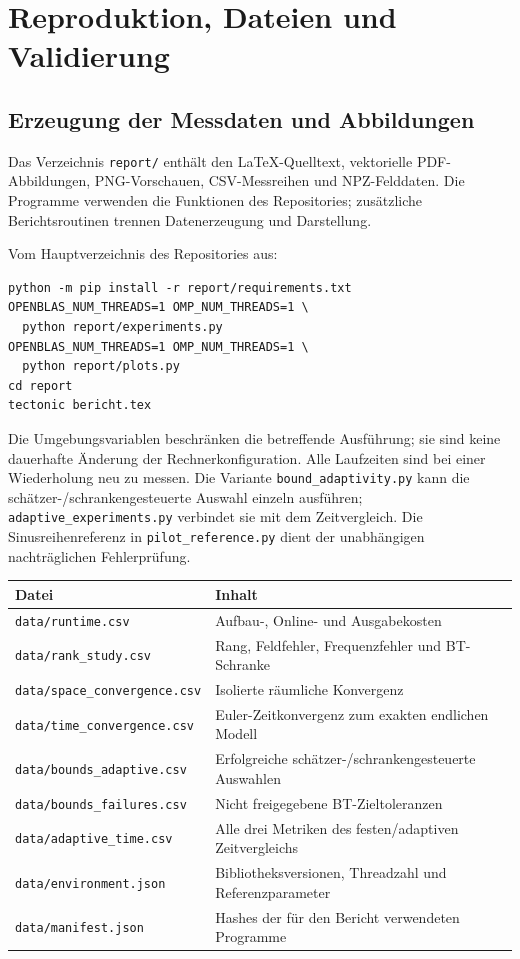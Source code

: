 \section{Reproduktion, Dateien und Validierung}
\subsection{Erzeugung der Messdaten und Abbildungen}
Das Verzeichnis \texttt{report/} enthält den LaTeX-Quelltext, vektorielle PDF-Abbildungen, PNG-Vorschauen, CSV-Messreihen und NPZ-Felddaten. Die Programme verwenden die Funktionen des Repositories; zusätzliche Berichtsroutinen trennen Datenerzeugung und Darstellung.

Vom Hauptverzeichnis des Repositories aus:
\begin{verbatim}
python -m pip install -r report/requirements.txt
OPENBLAS_NUM_THREADS=1 OMP_NUM_THREADS=1 \
  python report/experiments.py
OPENBLAS_NUM_THREADS=1 OMP_NUM_THREADS=1 \
  python report/plots.py
cd report
tectonic bericht.tex
\end{verbatim}
Die Umgebungsvariablen beschränken die betreffende Ausführung; sie sind keine dauerhafte Änderung der Rechnerkonfiguration. Alle Laufzeiten sind bei einer Wiederholung neu zu messen. Die Variante \texttt{bound\_adaptivity.py} kann die schätzer-/schrankengesteuerte Auswahl einzeln ausführen; \texttt{adaptive\_experiments.py} verbindet sie mit dem Zeitvergleich. Die Sinusreihenreferenz in \texttt{pilot\_reference.py} dient der unabhängigen nachträglichen Fehlerprüfung.

\begin{table}[htbp]\centering\small
\begin{tabularx}{\linewidth}{p{65mm}X}\toprule
Datei & Inhalt\\\midrule
\texttt{data/runtime.csv} & Aufbau-, Online- und Ausgabekosten\\
\texttt{data/rank\_study.csv} & Rang, Feldfehler, Frequenzfehler und BT-Schranke\\
\texttt{data/space\_convergence.csv} & Isolierte räumliche Konvergenz\\
\texttt{data/time\_convergence.csv} & Euler-Zeitkonvergenz zum exakten endlichen Modell\\
\texttt{data/bounds\_adaptive.csv} & Erfolgreiche schätzer-/schrankengesteuerte Auswahlen\\
\texttt{data/bounds\_failures.csv} & Nicht freigegebene BT-Zieltoleranzen\\
\texttt{data/adaptive\_time.csv} & Alle drei Metriken des festen/adaptiven Zeitvergleichs\\
\texttt{data/environment.json} & Bibliotheksversionen, Threadzahl und Referenzparameter\\
\texttt{data/manifest.json} & Hashes der für den Bericht verwendeten Programme\\\bottomrule
\end{tabularx}
\end{table}

